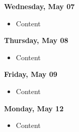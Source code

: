 \documentclass{article}
\begin{document}
\textbf{Wednesday, May 07}

\begin{itemize}
\item Content
\end{itemize}

\textbf{Thursday, May 08}

\begin{itemize}
\item Content
\end{itemize}

\textbf{Friday, May 09}

\begin{itemize}
\item Content
\end{itemize}

\textbf{Monday, May 12}

\begin{itemize}
\item Content
\end{itemize}
\end{document}
